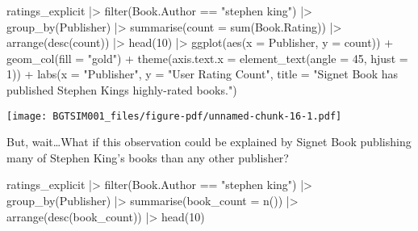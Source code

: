 \documentclass[
]{report}
\newenvironment{Shaded}{\begin{snugshade}}{\end{snugshade}}
\newcommand{\AttributeTok}[1]{\textcolor[rgb]{0.40,0.45,0.13}{#1}}
\newcommand{\DecValTok}[1]{\textcolor[rgb]{0.68,0.00,0.00}{#1}}
\newcommand{\FunctionTok}[1]{\textcolor[rgb]{0.28,0.35,0.67}{#1}}
\newcommand{\NormalTok}[1]{\textcolor[rgb]{0.00,0.23,0.31}{#1}}
\newcommand{\SpecialCharTok}[1]{\textcolor[rgb]{0.37,0.37,0.37}{#1}}
\newcommand{\StringTok}[1]{\textcolor[rgb]{0.13,0.47,0.30}{#1}}
\begin{document}
\begin{Shaded}
\begin{Highlighting}[]
\NormalTok{ratings\_explicit }\SpecialCharTok{|\textgreater{}} \FunctionTok{filter}\NormalTok{(Book.Author }\SpecialCharTok{==} \StringTok{"stephen king"}\NormalTok{) }\SpecialCharTok{|\textgreater{}}
                    \FunctionTok{group\_by}\NormalTok{(Publisher) }\SpecialCharTok{|\textgreater{}} 
                    \FunctionTok{summarise}\NormalTok{(}\AttributeTok{count =} \FunctionTok{sum}\NormalTok{(Book.Rating)) }\SpecialCharTok{|\textgreater{}}
                    \FunctionTok{arrange}\NormalTok{(}\FunctionTok{desc}\NormalTok{(count)) }\SpecialCharTok{|\textgreater{}}
                    \FunctionTok{head}\NormalTok{(}\DecValTok{10}\NormalTok{) }\SpecialCharTok{|\textgreater{}}
                    \FunctionTok{ggplot}\NormalTok{(}\FunctionTok{aes}\NormalTok{(}\AttributeTok{x =}\NormalTok{ Publisher, }\AttributeTok{y =}\NormalTok{ count)) }\SpecialCharTok{+}
                    \FunctionTok{geom\_col}\NormalTok{(}\AttributeTok{fill =} \StringTok{"gold"}\NormalTok{) }\SpecialCharTok{+}
                    \FunctionTok{theme}\NormalTok{(}\AttributeTok{axis.text.x =} \FunctionTok{element\_text}\NormalTok{(}\AttributeTok{angle =} \DecValTok{45}\NormalTok{, }\AttributeTok{hjust =} \DecValTok{1}\NormalTok{)) }\SpecialCharTok{+}
                    \FunctionTok{labs}\NormalTok{(}\AttributeTok{x =} \StringTok{"Publisher"}\NormalTok{, }
                         \AttributeTok{y =} \StringTok{"User Rating Count"}\NormalTok{,}
                         \AttributeTok{title =} \StringTok{"Signet Book has published Stephen King\textquotesingle{}s highly{-}rated books."}\NormalTok{)}
\end{Highlighting}
\end{Shaded}

\texttt{[image: BGTSIM001\_files/figure-pdf/unnamed-chunk-16-1.pdf]}

But, wait\ldots What if this observation could be explained by Signet
Book publishing many of Stephen King's books than any other publisher?

\begin{Shaded}
\begin{Highlighting}[]
\NormalTok{ratings\_explicit }\SpecialCharTok{|\textgreater{}} \FunctionTok{filter}\NormalTok{(Book.Author }\SpecialCharTok{==} \StringTok{"stephen king"}\NormalTok{) }\SpecialCharTok{|\textgreater{}}
                    \FunctionTok{group\_by}\NormalTok{(Publisher) }\SpecialCharTok{|\textgreater{}}
                    \FunctionTok{summarise}\NormalTok{(}\AttributeTok{book\_count =} \FunctionTok{n}\NormalTok{()) }\SpecialCharTok{|\textgreater{}} 
                    \FunctionTok{arrange}\NormalTok{(}\FunctionTok{desc}\NormalTok{(book\_count)) }\SpecialCharTok{|\textgreater{}}
                    \FunctionTok{head}\NormalTok{(}\DecValTok{10}\NormalTok{)}
\end{Highlighting}
\end{Shaded}
\end{document}
